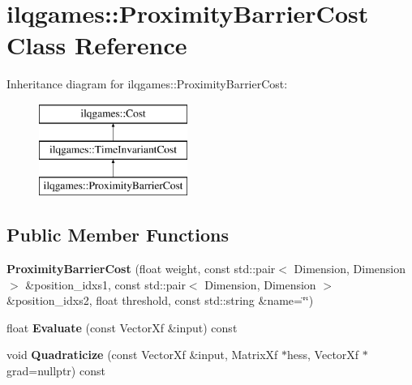 \hypertarget{classilqgames_1_1_proximity_barrier_cost}{}\section{ilqgames\+:\+:Proximity\+Barrier\+Cost Class Reference}
\label{classilqgames_1_1_proximity_barrier_cost}
Inheritance diagram for ilqgames\+:\+:Proximity\+Barrier\+Cost\+:\begin{figure}[H]
\begin{center}
\leavevmode
\includegraphics[height=3.000000cm]{classilqgames_1_1_proximity_barrier_cost}
\end{center}
\end{figure}
\subsection*{Public Member Functions}
\begin{DoxyCompactItemize}
\item 
{\bfseries Proximity\+Barrier\+Cost} (float weight, const std\+::pair$<$ Dimension, Dimension $>$ \&position\+\_\+idxs1, const std\+::pair$<$ Dimension, Dimension $>$ \&position\+\_\+idxs2, float threshold, const std\+::string \&name=\char`\"{}\char`\"{})\hypertarget{classilqgames_1_1_proximity_barrier_cost_a0843573444bee3fa13810d349cfab75c}{}\label{classilqgames_1_1_proximity_barrier_cost_a0843573444bee3fa13810d349cfab75c}

\item 
float {\bfseries Evaluate} (const Vector\+Xf \&input) const \hypertarget{classilqgames_1_1_proximity_barrier_cost_a72f234444b71c0167f02fcb7968d2570}{}\label{classilqgames_1_1_proximity_barrier_cost_a72f234444b71c0167f02fcb7968d2570}

\item 
void {\bfseries Quadraticize} (const Vector\+Xf \&input, Matrix\+Xf $\ast$hess, Vector\+Xf $\ast$grad=nullptr) const \hypertarget{classilqgames_1_1_proximity_barrier_cost_a594c1104e497ed9cbc3e74d753bb1853}{}\label{classilqgames_1_1_proximity_barrier_cost_a594c1104e497ed9cbc3e74d753bb1853}

\end{DoxyCompactItemize}
